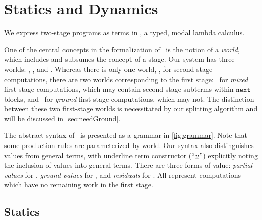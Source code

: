 
\section{\texorpdfstring{\lang}{λ12} Statics and Dynamics}
\label{sec:semantics}



We express two-stage programs as terms in \lang, a typed, modal lambda calculus. 

One of the central concepts in the formalization of \lang\ is the notion of a \emph{world},
which includes and subsumes the concept of a stage.
Our system has three worlds: \bbonem, \bbonep, and \bbtwo.
Whereas there is only one world, \bbtwo, for second-stage computations,
there are two worlds corresponding to the first stage:
\bbonem\ for \emph{mixed} first-stage computations, which may contain second-stage subterms within ${\tt next}$ blocks,
and \bbonep\ for \emph{ground} first-stage computations, which may not.
The distinction between these two first-stage worlds is necessitated by our splitting algorithm
and will be discussed in \ref{sec:needGround}.

The abstract syntax of \lang\ is presented as a grammar in \ref{fig:grammar}.  
Note that some production rules are parameterized by world.
Our syntax also distinguishes values from general terms, 
with underline term constructor (``$\underline{v}$'') explicitly noting the inclusion of values into general terms.
There are three forms of value: \emph{partial values} for \bbonem, \emph{ground values} for \bbonep, and \emph{residuals} for \bbtwo.
All represent computations which have no remaining work in the first stage.

\subsection{Statics}
\label{sec:statics}




